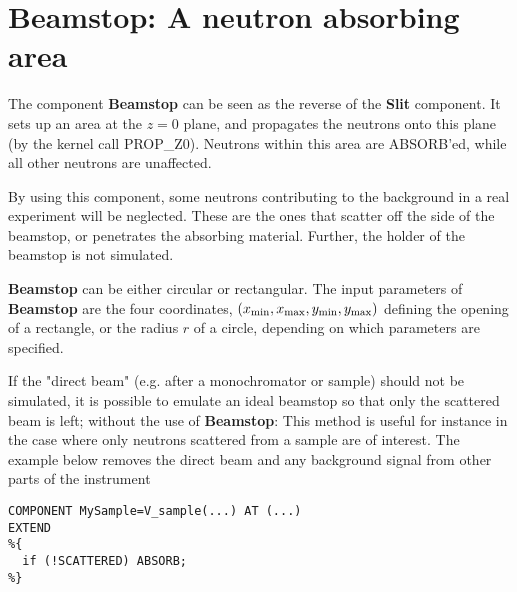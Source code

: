 \section{Beamstop: A neutron absorbing area}
\label{beamstop}


The component {\bf Beamstop} can be seen as the reverse of
the {\bf Slit} component.
It sets up an area at the $z=0$ plane, and propagates the neutrons
onto this plane (by the kernel call PROP\_Z0).
Neutrons within this area are ABSORB'ed,
while all other neutrons are unaffected.

By using this component, some neutrons contributing to the background
in a real experiment will be neglected.
These are the ones that scatter off the side
of the beamstop, or penetrates the absorbing material.
Further, the holder of the beamstop is not simulated.

{\bf Beamstop} can be either circular or rectangular.
The input parameters of {\bf Beamstop} are the four coordinates,
$(x_{\rm min}, x_{\rm max}, y_{\rm min}, y_{\rm max})$
defining the opening of a rectangle, or the radius $r$ of
a circle, depending on which parameters are specified.

If the "direct beam" (e.g. after a monochromator or sample) should not be
simulated, it is possible to emulate an ideal beamstop 
so that only the scattered beam is left;
without the use of {\bf Beamstop}:
This method is useful for instance in the case where only neutrons 
scattered from a sample are of interest. 
The example below removes the direct beam and 
any background signal from other parts of the instrument
\begin{verbatim}
COMPONENT MySample=V_sample(...) AT (...)
EXTEND
%{
  if (!SCATTERED) ABSORB;
%}
\end{verbatim}
